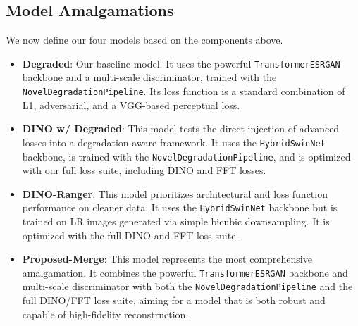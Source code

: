 \documentclass[10pt,twocolumn,letterpaper]{article}
\begin{document}
\subsection{Model Amalgamations}
We now define our four models based on the components above.
\begin{itemize}
    \item \textbf{Degraded}: Our baseline model. It uses the powerful \texttt{TransformerESRGAN} backbone and a multi-scale discriminator, trained with the \texttt{NovelDegradationPipeline}. Its loss function is a standard combination of L1, adversarial, and a VGG-based perceptual loss.
    \item \textbf{DINO w/ Degraded}: This model tests the direct injection of advanced losses into a degradation-aware framework. It uses the \texttt{HybridSwinNet} backbone, is trained with the \texttt{NovelDegradationPipeline}, and is optimized with our full loss suite, including DINO and FFT losses.
    \item \textbf{DINO-Ranger}: This model prioritizes architectural and loss function performance on cleaner data. It uses the \texttt{HybridSwinNet} backbone but is trained on LR images generated via simple bicubic downsampling. It is optimized with the full DINO and FFT loss suite.
    \item \textbf{Proposed-Merge}: This model represents the most comprehensive amalgamation. It combines the powerful \texttt{TransformerESRGAN} backbone and multi-scale discriminator with both the \texttt{NovelDegradationPipeline} and the full DINO/FFT loss suite, aiming for a model that is both robust and capable of high-fidelity reconstruction.
\end{itemize}
\end{document}
